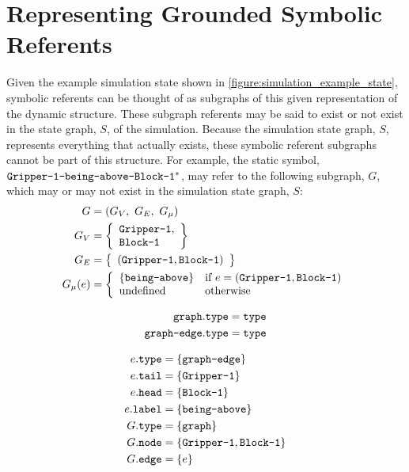 \section{Representing Grounded Symbolic Referents}

Given the example simulation state shown in
{\mbox{\autoref{figure:simulation_example_state}}}, symbolic referents
can be thought of as subgraphs of this given representation of the
dynamic structure.  These subgraph referents may be said to exist or
not exist in the state graph, $S$, of the simulation.  Because the
simulation state graph, $S$, represents everything that actually
exists, these symbolic referent subgraphs cannot be part of this
structure.  For example, the static symbol,
$\text{\tt{Gripper-1-being-above-Block-1}}^*$, may refer to the
following subgraph, $G$, which may or may not exist in the simulation
state graph, $S$:
\begin{align}
       G &= (G_V, ~G_E, ~G_\mu) \\
     G_V &= {\left\{
               \begin{array}{l}
                 \text{\tt{Gripper-1}}, \\
                 \text{\tt{Block-1}}
               \end{array}
             \right\}} \\
     G_E &= {\left\{
               \begin{array}{l}
                 (\text{\tt{Gripper-1}}, \text{\tt{Block-1}})
               \end{array}
             \right\}} \\
G_\mu(e) &=
  {\left\{
     \begin{array}{ll}
       \{\text{\tt{being-above}}\} & \text{if }e = (\text{\tt{Gripper-1}}, \text{\tt{Block-1}}) \\
       \text{undefined} & \text{otherwise}
     \end{array}
   \right.}
\end{align}

\begin{align}
     \text{\tt{graph}}.\text{\tt{type}} &= \text{\tt{type}} \\
\text{\tt{graph-edge}}.\text{\tt{type}} &= \text{\tt{type}}
\end{align}

\begin{align}
  e.\text{\tt{type}} &= \{\text{\tt{graph-edge}}\} \\
  e.\text{\tt{tail}} &= \{\text{\tt{Gripper-1}}\} \\
  e.\text{\tt{head}} &= \{\text{\tt{Block-1}}\} \\
 e.\text{\tt{label}} &= \{\text{\tt{being-above}}\} \\
  G.\text{\tt{type}} &= \{\text{\tt{graph}}\} \\
  G.\text{\tt{node}} &= \{\text{\tt{Gripper-1}}, \text{\tt{Block-1}}\} \\
  G.\text{\tt{edge}} &= \{e\}
\end{align}

